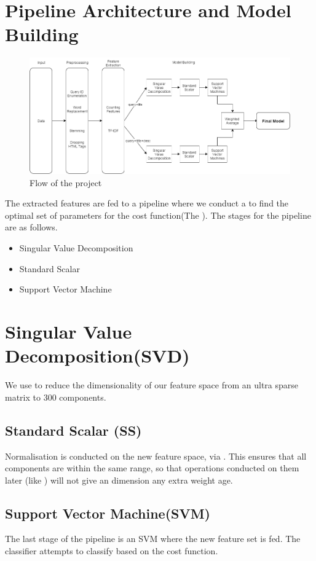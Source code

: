\documentclass[BTech]{nitkdiss}
\begin{document}
\section{Pipeline Architecture and Model Building}
\begin{figure}[h!]
\centering
\includegraphics[scale=0.50]{flowchart.png}
\caption{Flow of the project}
\label{fig:flowchart}
\end{figure}
The extracted features are fed to a pipeline where we conduct a  to find the optimal set of parameters for the cost function(The ). The stages for the pipeline are as follows.
\begin{itemize}
\item{Singular Value Decomposition}
\item{Standard Scalar}
\item{Support Vector Machine}
\end{itemize}
\section{Singular Value Decomposition(SVD)}
We use  to reduce the dimensionality of our feature space from an ultra sparse matrix to 300 components.
\subsection{Standard Scalar (SS)}
Normalisation is conducted on the new feature space, via . This ensures that all components are within the same range, so that operations conducted on them later (like ) will not give an dimension any extra weight age.
\subsection{Support Vector Machine(SVM)}
The last stage of the pipeline is an SVM where the new feature set is fed. The classifier attempts to classify based on the cost function.
\end{document}
